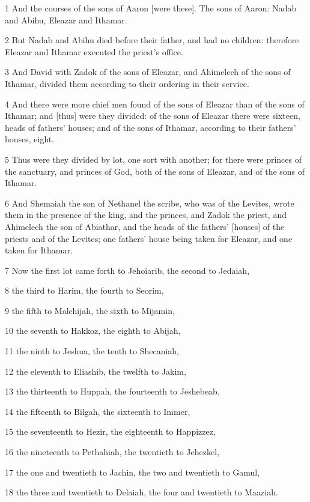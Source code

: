 \par 1 And the courses of the sons of Aaron [were these]. The sons of Aaron: Nadab and Abihu, Eleazar and Ithamar.
\par 2 But Nadab and Abihu died before their father, and had no children: therefore Eleazar and Ithamar executed the priest's office.
\par 3 And David with Zadok of the sons of Eleazar, and Ahimelech of the sons of Ithamar, divided them according to their ordering in their service.
\par 4 And there were more chief men found of the sons of Eleazar than of the sons of Ithamar; and [thus] were they divided: of the sons of Eleazar there were sixteen, heads of fathers' houses; and of the sons of Ithamar, according to their fathers' houses, eight.
\par 5 Thus were they divided by lot, one sort with another; for there were princes of the sanctuary, and princes of God, both of the sons of Eleazar, and of the sons of Ithamar.
\par 6 And Shemaiah the son of Nethanel the scribe, who was of the Levites, wrote them in the presence of the king, and the princes, and Zadok the priest, and Ahimelech the son of Abiathar, and the heads of the fathers' [houses] of the priests and of the Levites; one fathers' house being taken for Eleazar, and one taken for Ithamar.
\par 7 Now the first lot came forth to Jehoiarib, the second to Jedaiah,
\par 8 the third to Harim, the fourth to Seorim,
\par 9 the fifth to Malchijah, the sixth to Mijamin,
\par 10 the seventh to Hakkoz, the eighth to Abijah,
\par 11 the ninth to Jeshua, the tenth to Shecaniah,
\par 12 the eleventh to Eliashib, the twelfth to Jakim,
\par 13 the thirteenth to Huppah, the fourteenth to Jeshebeab,
\par 14 the fifteenth to Bilgah, the sixteenth to Immer,
\par 15 the seventeenth to Hezir, the eighteenth to Happizzez,
\par 16 the nineteenth to Pethahiah, the twentieth to Jehezkel,
\par 17 the one and twentieth to Jachin, the two and twentieth to Gamul,
\par 18 the three and twentieth to Delaiah, the four and twentieth to Maaziah.
